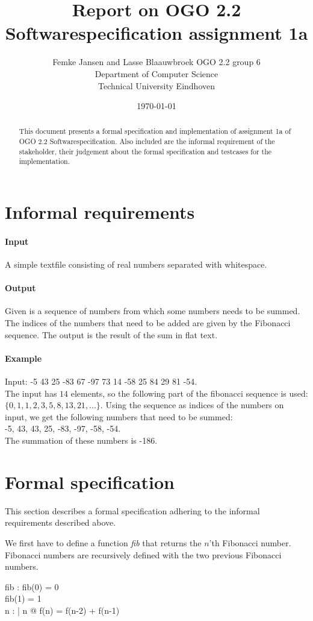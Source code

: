 \documentclass[12pt]{article}
\title{Report on OGO 2.2 Softwarespecification assignment 1a}
\author{
        Femke Jansen and Lasse Blaauwbroek OGO 2.2 group 6 \\
                Department of Computer Science\\
        Technical University Eindhoven\\
}
\date{\today}
\begin{document}
\maketitle

\begin{abstract}
This document presents a formal specification and implementation of assignment 1a of OGO 2.2 Softwarespecification. Also included are the informal requirement of the stakeholder, their judgement about the formal specification and testcases for the implementation.
\end{abstract}

\section{Informal requirements}
\paragraph{Input} A simple textfile consisting of real numbers separated with whitespace.
\paragraph{Output} Given is a sequence of numbers from which some numbers needs to be summed. The indices of the numbers that need to be added are given by the Fibonacci sequence. The output is the result of the sum in flat text.
\paragraph{Example}
Input: -5 43 25 -83  67 -97  73  14  -58 25  84   29 81  -54.\\
The input has $14$ elements, so the following part of the fibonacci sequence is used: $\{0, 1, 1, 2, 3, 5, 8, 13, 21, ...\}$. Using the sequence as indices of the numbers on input, we get the following numbers that need to be summed: \\ -5, 43, 43, 25, -83, -97, -58, -54. \\ The summation of these numbers is -186.

\section{Formal specification}

This section describes a formal specification adhering to the informal requirements described above.

We first have to define a function  \textit{fib} that returns the $n$'th Fibonacci number. Fibonacci numbers are recursively defined with the two previous Fibonacci numbers.
\begin{axdef}
fib : \nat \fun \nat
\where
fib(0) = 0 \\
fib(1) = 1 \\
\forall n : \nat | n  @ f(n) = f(n-2) + f(n-1)
\end{axdef}
\end{document}
